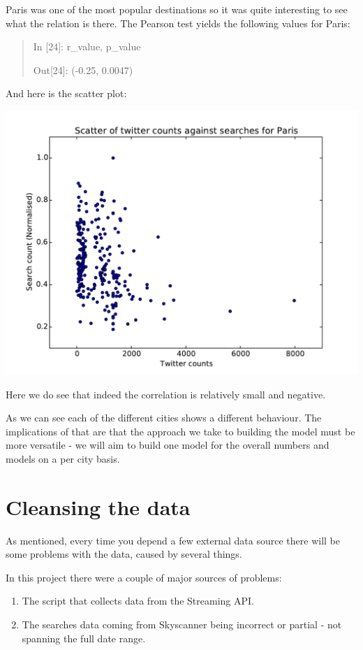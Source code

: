 \documentclass[minf,frontabs,twoside,singlespacing,parskip]{infthesis}
\begin{document}
Paris was one of the most popular destinations so it was quite interesting to see what the relation is there. The Pearson test yields the following values for Paris:
\begin{quotation}
In [24]: r\_value, p\_value

Out[24]: (-0.25, 0.0047)
\end{quotation}
\newpage
And here is the scatter plot:

\includegraphics[width=\textwidth]{Paris}

Here we do see that indeed the correlation is relatively small and negative. 

As we can see each of the different cities shows a different behaviour. The implications of that are that the approach we take to building the model must be more versatile - we will aim to build one model for the overall numbers and models on a per city basis.

\section{Cleansing the data}

As mentioned, every time you depend a few external data source there will be some problems with the data, caused by several things. 

In this project there were a couple of major sources of problems:
\begin{enumerate}
\item The script that collects data from the Streaming API.
\item The searches data coming from Skyscanner being incorrect or partial - not spanning the full date range.
\end{enumerate}
\end{document}
